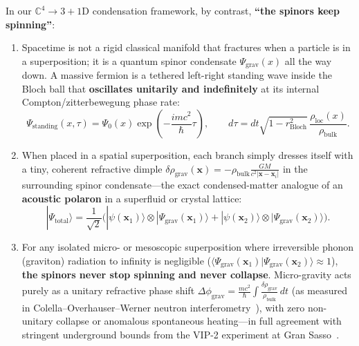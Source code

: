 \documentclass[11pt,a4paper]{article}
\begin{document}
In our $\mathbb{C}^4 \to 3+1\text{D}$ condensation framework, by contrast, \textbf{``the spinors keep spinning''}:
\begin{enumerate}
    \item Spacetime is not a rigid classical manifold that fractures when a particle is in a superposition; it is a quantum spinor condensate $\Psi_{\text{grav}}(x)$ all the way down. A massive fermion is a tethered left-right standing wave inside the Bloch ball that \textbf{oscillates unitarily and indefinitely} at its internal Compton/zitterbewegung phase rate:
    \begin{equation}
    \Psi_{\text{standing}}(x, \tau) = \Psi_0(x)\exp\!\left(-\frac{i m c^2}{\hbar}\tau\right), \qquad d\tau = dt\sqrt{1 - r_{\text{Bloch}}^2}\,\frac{\rho_{\text{loc}}(x)}{\rho_{\text{bulk}}}.
    \end{equation}
    \item When placed in a spatial superposition, each branch simply dresses itself with a tiny, coherent refractive dimple $\delta\rho_{\text{grav}}(\mathbf{x}) = -\rho_{\text{bulk}}\frac{GM}{c^2|\mathbf{x} - \mathbf{x}_i|}$ in the surrounding spinor condensate---the exact condensed-matter analogue of an \textbf{acoustic polaron} in a superfluid or crystal lattice:
    \begin{equation}
    |\Psi_{\text{total}}\rangle = \frac{1}{\sqrt{2}}\Big(|\psi(\mathbf{x}_1)\rangle \otimes |\Psi_{\text{grav}}(\mathbf{x}_1)\rangle + |\psi(\mathbf{x}_2)\rangle \otimes |\Psi_{\text{grav}}(\mathbf{x}_2)\rangle\Big).
    \end{equation}
    \item For any isolated micro- or mesoscopic superposition where irreversible phonon (graviton) radiation to infinity is negligible ($\langle\Psi_{\text{grav}}(\mathbf{x}_1)|\Psi_{\text{grav}}(\mathbf{x}_2)\rangle \approx 1$), \textbf{the spinors never stop spinning and never collapse}. Micro-gravity acts purely as a unitary refractive phase shift $\Delta\phi_{\text{grav}} = \frac{mc^2}{\hbar}\int \frac{\delta\rho_{\text{grav}}}{\rho_{\text{bulk}}}\, dt$ (as measured in Colella--Overhauser--Werner neutron interferometry~\cite{COW1975}), with zero non-unitary collapse or anomalous spontaneous heating---in full agreement with stringent underground bounds from the VIP-2 experiment at Gran Sasso~\cite{DonadiVIP2021}.
\end{enumerate}
\end{document}
